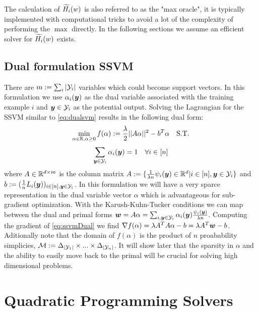 The calculation of $\widetilde{H_i}(w)$ is also referred to as the "max oracle", it is typically implemented with computational tricks to avoid a lot of the complexity of performing the $\max$ directly. In the following sections we assume an efficient solver for $\widetilde{H_i}(w)$ exists. 

\subsection{Dual formulation SSVM}

There are $m:=\sum_i |\mathcal{Y}_i|$ variables which could become support vectors. In this formulation we use $\alpha_i(\bm{y})$ as the dual variable associated with the training example $i$ and $\bm{y} \in \mathcal{Y}_i$ as the potential output. Solving the Lagrangian for the SSVM similar to \ref{eq:dualsvm} results in the following dual form:
\begin{align}\label{eq:ssvmDual}
\min_{\alpha \in \mathbb{R}, \alpha \geq 0 } f(\alpha) := \frac{\lambda}{2} ||A \alpha||^2 - b^T \alpha   \quad  \text{S.T.}
\end{align}
\begin{align}
\sum_{\bm{y} \in \mathcal{Y}_i} \alpha_i(\bm{y}) = 1 \quad \forall i \in [n]
\end{align}
where $A \in  \mathbb{R}^{d \times m}$ is the column matrix $A := \{ \frac{1}{\lambda n} \psi_i(\bm{y}) \in \mathbb{R}^{d} | i \in [n], \bm{y} \in \mathcal{Y}_i \}$ and  $b := ( \frac{1}{n}L_i(\bm{y}))_{i \in [n], \bm{y} \in \mathcal{Y}_i}$. In this formulation we will have a very sparce representation in the dual variable vector $\alpha$ which is advantageous for sub-gradient optimization. With the Karush-Kuhn-Tucker conditions we can map between the dual and primal forms $\bm{w} = A \alpha = \sum_{i,\bm{y} \in \mathcal{Y}_i} \alpha_i(\bm{y}) \frac{\psi_i(\bm{y})}{\lambda n}$. Computing the gradient of \ref{eq:ssvmDual} we find $\nabla f(\alpha) = \lambda A^T A \alpha - b = \lambda A^T \bm{w} - b$. Aditionally note that the domain of $f(\alpha)$ is the product of $n$ proabability simplicies, $\mathcal{M} := \Delta_{| \mathcal{Y}_1|} \times ... \times \Delta_{|\mathcal{Y}_n|}$.
It will show later that the sparsity in $\alpha$ and the ability to easily move back to the primal will be crucial for solving high dimensional problems. 

\section{Quadratic Programming Solvers}
